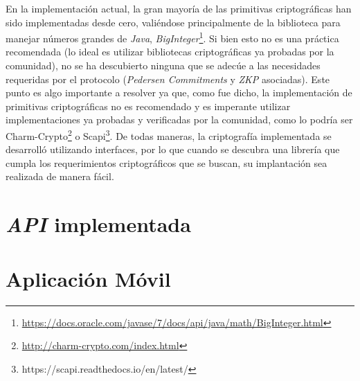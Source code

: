 En la implementación actual, la gran mayoría de las primitivas criptográficas han sido implementadas desde cero, valiéndose principalmente de la biblioteca para manejar números grandes de \emph{Java}, \emph{BigInteger}\footnote{\url{https://docs.oracle.com/javase/7/docs/api/java/math/BigInteger.html}}. Si bien esto no es una práctica recomendada (lo ideal es utilizar bibliotecas criptográficas ya probadas por la comunidad), no se ha descubierto ninguna que se adecúe a las necesidades requeridas por el protocolo (\emph{Pedersen Commitments} y \emph{ZKP} asociadas). Este punto es algo importante a resolver ya que, como fue dicho, la implementación de primitivas criptográficas no es recomendado y es imperante utilizar implementaciones ya probadas y verificadas por la comunidad, como lo podría ser Charm-Crypto\footnote{\url{http://charm-crypto.com/index.html}} o Scapi\footnote{https://scapi.readthedocs.io/en/latest/}. De todas maneras, la criptografía implementada se desarrolló utilizando interfaces, por lo que cuando se descubra una librería que cumpla los requerimientos criptográficos que se buscan, su implantación sea realizada de manera fácil.

\section{\emph{API} implementada}
\section{Aplicación Móvil}